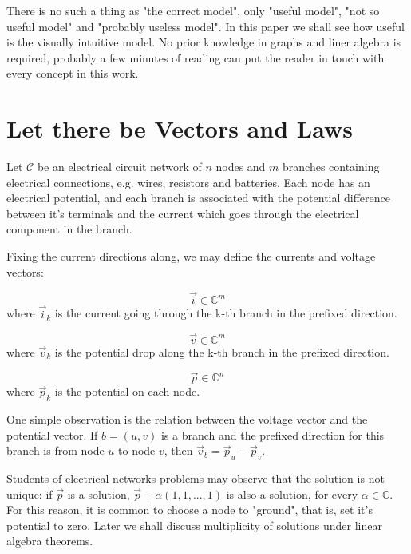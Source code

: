 \documentclass{comjnl}
\begin{document}
There is no such a thing as "the correct model", only "useful model", "not so useful model" and "probably useless model". In this paper we shall see how useful is the visually intuitive model. No prior knowledge in graphs and liner algebra is required, probably a few minutes of reading can put the reader in touch with every concept in this work.

\section{Let there be Vectors and Laws}
Let $\mathcal{C}$ be an electrical circuit network of $n$ nodes and $m$ branches containing electrical connections, e.g. wires, resistors and batteries. Each node has an electrical potential, and each branch is associated with the potential difference between it's terminals and the current which goes through the electrical component in the branch.

Fixing the current directions along, we may define the currents and voltage vectors:
\begin{definition}
$$ \vec{i} \in \mathbb{C}^m$$ where $\vec{i}_k$ is the current going through the k-th branch in the prefixed direction.
\end{definition}
\begin{definition}
$$ \vec{v} \in \mathbb{C}^m$$ where $\vec{v}_k$ is the potential drop along the k-th branch in the prefixed direction.
\end{definition}
\begin{definition}
$$ \vec{p} \in \mathbb{C}^n$$ where $\vec{p}_k$ is the potential on each node.
\end{definition}

\begin{remark}
One simple observation is the relation between the voltage vector and the potential vector. If $b=(u,v)$ is a branch and the prefixed direction for this branch is from node $u$ to node $v$, then $\vec{v}_b = \vec{p}_u - \vec{p}_v$.
\end{remark}

\begin{remark}[Uniqueness]
\label{Re:Uniqueness}
Students of electrical networks problems may observe that the solution is not unique: if $\vec{p}$ is a solution, $\vec{p}+\alpha(1,1,...,1)$ is also a solution, for every $\alpha \in \mathbb{C}$. For this reason, it is common to choose a node to "ground", that is, set it's potential to zero. Later we shall discuss multiplicity of solutions under linear algebra theorems.
\end{remark}
\end{document}
